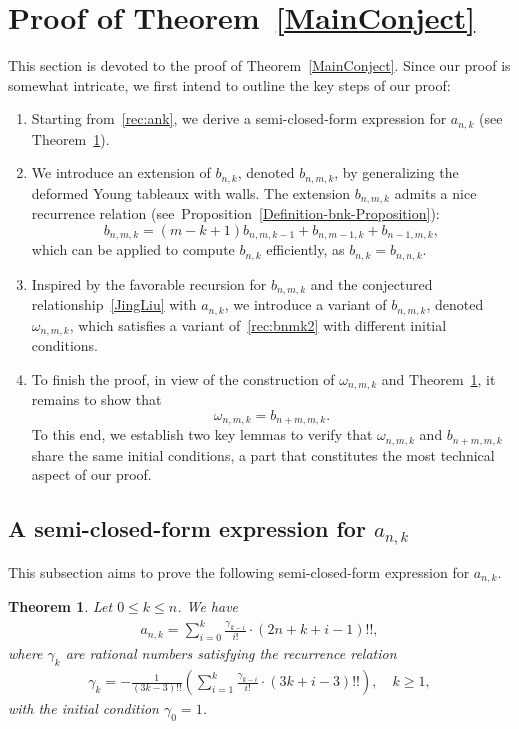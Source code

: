 \documentclass[reqno, 12pt]{article}
\newtheorem{thm}{Theorem}[section]
\theoremstyle{mydefinition}
\theoremstyle{myremark}
\numberwithin{algorithm}{section}
\begin{document}
\section{Proof of Theorem~\ref{MainConject}}
\label{proof:conj1}

This section is devoted to the proof of Theorem~\ref{MainConject}. Since our proof is somewhat intricate, we first intend to outline the key steps of our proof:
\begin{enumerate}
\item Starting from~\eqref{rec:ank}, we derive a semi-closed-form expression for $a_{n,k}$ (see Theorem~\ref{Semi-closed-formula-Ank}).
\item We introduce an extension  of $b_{n,k}$, denoted $b_{n,m,k}$,  by generalizing  the deformed Young tableaux with walls. The extension  $b_{n,m,k}$ admits a nice recurrence relation (see~Proposition~\ref{Definition-bnk-Proposition}):
\begin{equation}\label{rec:bnmk2}
b_{n,m,k}=(m-k+1)b_{n,m,k-1} + b_{n,m-1,k} + b_{n-1,m,k},
\end{equation}
which can be applied to compute $b_{n,k}$ efficiently, as  $b_{n,k}=b_{n,n,k}$.
\item Inspired  by the favorable recursion for $b_{n,m,k}$ and the conjectured relationship~\eqref{JingLiu} with $a_{n,k}$, we introduce a variant of $b_{n,m,k}$, denoted $\omega_{n,m,k}$, which satisfies a variant of~\eqref{rec:bnmk2} with different initial conditions.
\item To finish the proof, in view of the construction of $\omega_{n,m,k}$ and Theorem~\ref{Semi-closed-formula-Ank}, it remains to show that $$\omega_{n,m,k}=b_{n+m,m,k}.$$
    To this end, we establish two key lemmas to verify that $\omega_{n,m,k}$ and $b_{n+m,m,k}$ share the same initial conditions, a part that constitutes the most technical aspect of our proof.
\end{enumerate}


\subsection{A semi-closed-form expression for $a_{n,k}$ }
This subsection aims to prove the following semi-closed-form expression for $a_{n,k}$.

\begin{thm}\label{Semi-closed-formula-Ank}
Let $0\leq k\leq n$. We have
\begin{align*}
a_{n,k}=\sum_{i=0}^k \frac{\gamma_{k-i}}{i!}\cdot (2n+k+i-1)!!,
\end{align*}
where $\gamma_k$ are rational numbers satisfying the recurrence relation
\begin{align}\label{Recurren-Ck0}
\gamma_k=-\frac{1}{(3k-3)!!} \left(\sum_{i=1}^k \frac{\gamma_{k-i}}{i!}\cdot (3k+i-3)!! \right), \quad k\geq 1,
\end{align}
with the initial condition $\gamma_0=1$.
\end{thm}
\end{document}
